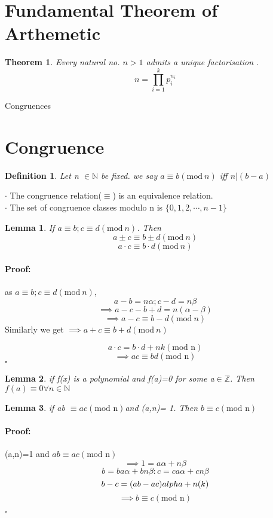 \documentclass{report}
\newtheorem{defn}{Definition}[section]
\newtheorem{lemma}{Lemma}[section]
\newtheorem{theorem}{Theorem}[section]
\newcommand{\n}{\mathbb{N}}
\newcommand{\z}{\mathbb{Z}}
\renewenvironment{proof}{\paragraph{Proof:}}{\hfill$\square$}
\begin{document}
\section{Fundamental Theorem of Arthemetic}
\begin{theorem}
    Every natural no. $n>1$ admits a unique factorisation .$$n=\prod_{i=1}^{k} p_{i}^{n_i}$$
\end{theorem}



\begin{chapter}
    {Congruences}
\end{chapter}
\section{Congruence}
 \begin{defn}
     Let n $\in \n$ be fixed. we say $a \equiv b (\textrm{mod}\ n) $ iff $n|(b-a)$  
 \end{defn}

$\cdot$ The congruence relation($\equiv$) is an equivalence relation.
\\
$\cdot$ The set of congruence classes modulo n is $\{ 0,1,2,\cdots ,n-1\}$

\begin{lemma}
    If $a \equiv b;c\equiv d (\textrm{mod}\ n)$. Then 
$$a\pm c\equiv b \pm d (\textrm{mod}\ n)$$
$$a\cdot c \equiv b \cdot d (\textrm{mod}\ n)$$
\end{lemma}
\begin{proof}
    as $a \equiv b;c\equiv d (\textrm{mod}\ n)$,
    $$a-b=n\alpha;c-d=n\beta$$
    $$\implies a-c-b+d=n(\alpha-\beta)$$
    $$\implies a-c \equiv b-d (\textrm{mod}\ n)$$
    Similarly we get $\implies a+c \equiv b+d (\textrm{mod}\ n)$

    $$a\cdot c=b\cdot d+nk (\textrm{mod n})$$
    $$\implies ac \equiv bd (\textrm{mod n})$$
\end{proof}

\begin{lemma}
    if f(x) is a polynomial and f(a)=0 for some a$\in \z$. Then $f(a)\equiv 0 \forall n\in \n$
\end{lemma}
\begin{lemma}
    if ab $\equiv ac (\textrm{mod n})$and (a,n)= 1. Then $b\equiv c (\textrm{mod n})$
\end{lemma}
\begin{proof}
    (a,n)=1 and $ab\equiv ac (\textrm{mod n})$ $$\implies 1= a\alpha+n\beta$$
    $$b= ba\alpha+bn\beta : c=  ca\alpha+cn\beta$$
    $$b-c= (ab-ac)\\alpha + n(k)$$
    $$\implies b \equiv c  (\textrm{mod n}) $$
    
\end{proof}
\end{document}
